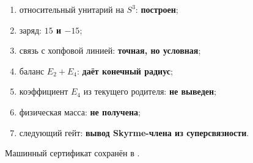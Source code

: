 \begin{protocol}
\begin{enumerate}
 \item относительный унитарий на $S^3$: \textbf{построен};
 \item заряд: \textbf{$15$ и $-15$};
 \item связь с хопфовой линией: \textbf{точная, но условная};
 \item баланс $E_2+E_4$: \textbf{даёт конечный радиус};
 \item коэффициент $E_4$ из текущего родителя: \textbf{не выведен};
 \item физическая масса: \textbf{не получена};
 \item следующий гейт: \textbf{вывод Skyrme-члена из суперсвязности}.
\end{enumerate}
\end{protocol}

Машинный сертификат сохранён в
.